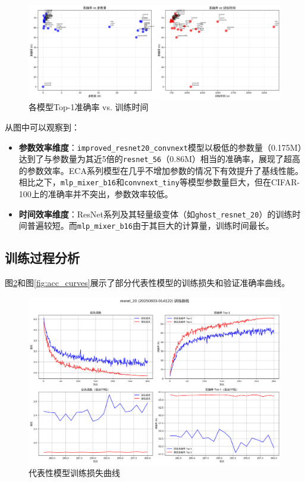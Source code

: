 \documentclass[a4paper]{article}
\begin{document}
\begin{figure}[H]
    \centering
    \includegraphics[width=\textwidth]{fig/efficiency_analysis.png}
    \caption{各模型Top-1准确率 vs. 训练时间}
    \label{fig:acc_time}
\end{figure}

从图中可以观察到：
\begin{itemize}
    \item \textbf{参数效率维度}：\texttt{improved\_resnet20\_convnext}模型以极低的参数量（0.175M）达到了与参数量为其近5倍的\texttt{resnet\_56}（0.86M）相当的准确率，展现了超高的参数效率。ECA系列模型在几乎不增加参数的情况下有效提升了基线性能。相比之下，\texttt{mlp\_mixer\_b16}和\texttt{convnext\_tiny}等模型参数量巨大，但在CIFAR-100上的准确率并不突出，参数效率较低。
    \item \textbf{时间效率维度}：ResNet系列及其轻量级变体（如\texttt{ghost\_resnet\_20}）的训练时间普遍较短。而\texttt{mlp\_mixer\_b16}由于其巨大的计算量，训练时间最长。
\end{itemize}

\subsection{训练过程分析}
图\ref{fig:loss_curves}和图\ref{fig:acc_curves}展示了部分代表性模型的训练损失和验证准确率曲线。

\begin{figure}[H]
    \centering
    \includegraphics[width=\textwidth]{fig/training_curves_resnet_20.png}
    \caption{代表性模型训练损失曲线}
    \label{fig:loss_curves}
\end{figure}
\end{document}
